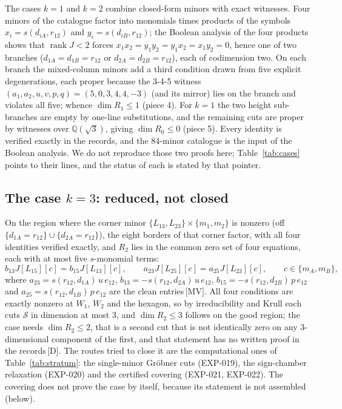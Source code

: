 \documentclass[11pt]{article}
\theoremstyle{definition}
\theoremstyle{remark}
\newcommand{\mk}[1]{\,{\scriptsize[#1]}}
\newcommand{\MV}{\mk{MV}}
\newcommand{\Dm}{\mk{D}}
\begin{document}
The cases $k=1$ and $k=2$ combine closed-form minors with exact witnesses. Four minors of the catalogue factor into
monomials times products of the symbols $x_i=s(d_{iA},r_{12})$ and $y_i=s(d_{iB},r_{12})$; the Boolean analysis of
the four products shows that $\operatorname{rank}J<2$ forces $x_1x_2=y_1y_2=y_1x_2=x_1y_2=0$, hence one of two branches
($d_{1A}=d_{1B}=r_{12}$ or $d_{2A}=d_{2B}=r_{12}$), each of codimension two. On each branch the mixed-column minors
add a third condition drawn from five explicit degenerations, each proper because the 3-4-5 witness
$(a_1,a_2,u,v,p,q)=(5,0,3,4,4,-3)$ (and its mirror) lies on the branch and violates all five; whence
$\dim R_1\le1$ (piece 4). For $k=1$ the two height sub-branches are empty by one-line substitutions, and the remaining
cuts are proper by witnesses over $\mathbb{Q}(\sqrt3)$, giving $\dim R_0\le0$ (piece 5). Every identity is verified
exactly in the records, and the 84-minor catalogue is the input of the Boolean analysis. We do not reproduce those two
proofs here; Table~\ref{tab:cases} points to their lines, and the status of each is stated by that pointer.

\subsection{The case \texorpdfstring{$k=3$}{k=3}: reduced, not closed}

On the region where the corner minor $\{L_{13},L_{23}\}\times\{m_1,m_2\}$ is nonzero (off
$\{d_{1A}=r_{12}\}\cup\{d_{2A}=r_{12}\}$), the eight borders of that corner factor, with all four identities verified
exactly, and
$R_2$ lies in the common zero set of four equations, each with at most five $s$-monomial terms:
\begin{equation}\label{eq:bilinear}
b_{13}J[L_{15}][c]=b_{15}J[L_{13}][c],\qquad a_{23}J[L_{25}][c]=a_{25}J[L_{23}][c],\qquad c\in\{m_A,m_B\},
\end{equation}
where $a_{23}=s(r_{12},d_{1A})\,u\,e_{12}$, $b_{13}=-s(r_{12},d_{2A})\,u\,e_{12}$, $b_{15}=-s(r_{12},d_{2B})\,p\,e_{12}$ and
$a_{25}=s(r_{12},d_{1B})\,p\,e_{12}$ are the clean entries\MV. All four conditions are exactly nonzero at $W_1$, $W_2$ and the
hexagon, so by irreducibility and Krull each cuts $\mathcal S$ in dimension at most 3, and $\dim R_2\le 3$ follows on the good region;
the case needs $\dim R_2\le2$, that is a second cut that is not identically zero on any 3-dimensional component of
the first, and that statement has no written proof in the records\Dm. The routes tried to close it are
the computational ones of Table~\ref{tab:stratum}: the single-minor Gr\"obner cuts (EXP-019), the sign-chamber relaxation
(EXP-020) and the certified covering (EXP-021, EXP-022). The covering does not prove the case by itself, because its
statement is not assembled (below).
\end{document}
